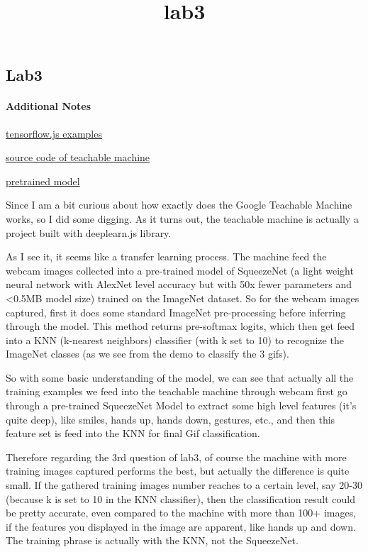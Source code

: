\documentclass[11pt]{article}
\title{lab3}
\begin{document}
    
    
    \maketitle
    
    

    
    \subsection{Lab3}\label{lab3}

    \paragraph{Additional Notes}\label{additional-notes}

    \href{https://js.tensorflow.org/}{tensorflow.js examples}

\href{https://github.com/googlecreativelab/teachable-machine/tree/master/src/ai}{source
code of teachable machine}

\href{https://storage.googleapis.com/teachable-machine-squeezenet/}{pretrained
model}

    Since I am a bit curious about how exactly does the Google Teachable
Machine works, so I did some digging. As it turns out, the teachable
machine is actually a project built with deeplearn.js library.

As I see it, it seems like a transfer learning process. The machine feed
the webcam images collected into a pre-trained model of SqueezeNet (a
light weight neural network with AlexNet level accuracy but with 50x
fewer parameters and \textless{}0.5MB model size) trained on the
ImageNet dataset. So for the webcam images captured, first it does some
standard ImageNet pre-processing before inferring through the model.
This method returns pre-softmax logits, which then get feed into a KNN
(k-nearest neighbors) classifier (with k set to 10) to recognize the
ImageNet classes (as we see from the demo to classify the 3 gifs).

So with some basic understanding of the model, we can see that actually
all the training examples we feed into the teachable machine through
webcam first go through a pre-trained SqueezeNet Model to extract some
high level features (it's quite deep), like smiles, hands up, hands
down, gestures, etc., and then this feature set is feed into the KNN for
final Gif classification.

Therefore regarding the 3rd question of lab3, of course the machine with
more training images captured performs the best, but actually the
difference is quite small. If the gathered training images number
reaches to a certain level, say 20-30 (because k is set to 10 in the KNN
classifier), then the classification result could be pretty accurate,
even compared to the machine with more than 100+ images, if the features
you displayed in the image are apparent, like hands up and down. The
training phrase is actually with the KNN, not the SqueezeNet.
\end{document}
